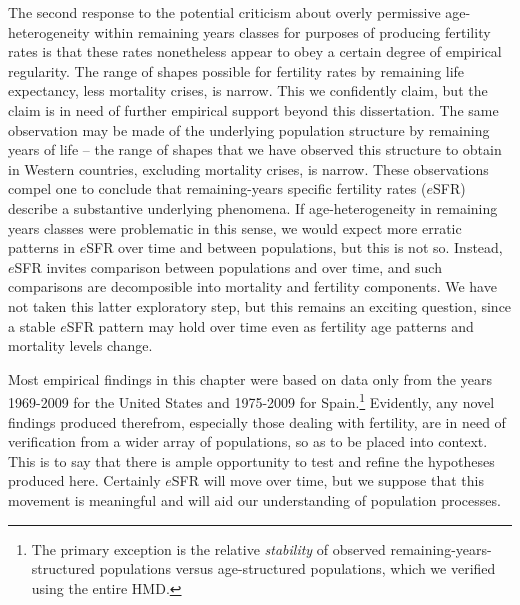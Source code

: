 The second response to the potential criticism about overly permissive
age-heterogeneity within remaining years classes for purposes of producing
fertility rates is that these rates nonetheless appear to obey a
certain degree of empirical regularity. The range of shapes possible for
fertility rates by remaining life expectancy, less mortality
crises, is narrow. This we confidently claim, but the claim is in need of
further empirical support beyond this dissertation. The same observation may be made of
the underlying population structure by remaining years of life -- the range of 
shapes that we have observed this structure to obtain in Western countries, 
excluding mortality crises, is narrow. These observations compel one to conclude
that remaining-years specific fertility rates ($e$SFR) describe a substantive
underlying phenomena. If age-heterogeneity in remaining years classes 
were problematic in this sense, we would expect more erratic patterns in
$e$SFR over time and between populations, but this is not so. Instead, $e$SFR
invites comparison between populations and over time, and such comparisons are
decomposible into mortality and fertility components. We have not
taken this latter exploratory step, but this remains an exciting question, since
a stable $e$SFR pattern may hold over time even as fertility age patterns and
mortality levels change.

Most empirical findings in this chapter were based on data only
from the years 1969-2009 for the United States and 1975-2009 for
Spain.\footnote{The primary exception is the relative \textit{stability} of
observed remaining-years-structured populations versus age-structured
populations, which we verified using the entire HMD.} Evidently, any
novel findings produced therefrom, especially those dealing with fertility, 
are in need of verification from a wider array of
populations, so as to be placed into context. This is to say that there is ample opportunity to test
and refine the hypotheses produced here. Certainly $e$SFR will move over time,
but we suppose that this movement is meaningful and will aid our understanding
of population processes.

